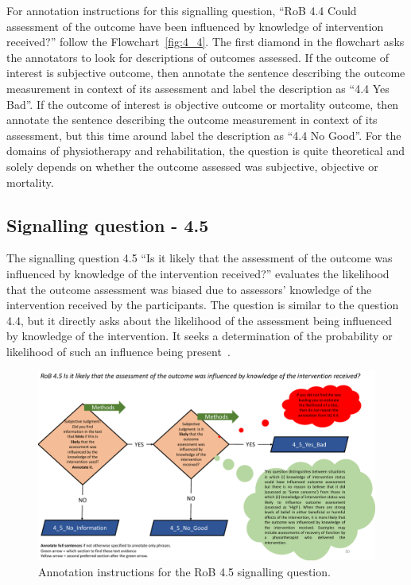 \documentclass[sn-mathphys,Numbered]{sn-jnl}%
\begin{document}
For annotation instructions for this signalling question, ``RoB 4.4 Could assessment of the outcome have been influenced by knowledge of intervention received?'' follow the Flowchart~\ref{fig:4_4}.
The first diamond in the flowchart asks the annotators to look for descriptions of outcomes assessed.
If the outcome of interest is subjective outcome, then annotate the sentence describing the outcome measurement in context of its assessment and label the description as ``4.4 Yes Bad''.
If the outcome of interest is objective outcome or mortality outcome, then annotate the sentence describing the outcome measurement in context of its assessment, but this time around label the description as ``4.4 No Good''.
For the domains of physiotherapy and rehabilitation, the question is quite theoretical and solely depends on whether the outcome assessed was subjective, objective or mortality.


%
%
%
\subsection*{Signalling question - 4.5 }
\label{subsec:4_5}
%
The signalling question 4.5 ``Is it likely that the assessment of the outcome was influenced by knowledge of the intervention received?'' evaluates the likelihood that the outcome assessment was biased due to assessors' knowledge of the intervention received by the participants.
The question is similar to the question 4.4, but it directly asks about the likelihood of the assessment being influenced by knowledge of the intervention.
It seeks a determination of the probability or likelihood of such an influence being present~\cite{watanabe2022treatment,hrobjartsson2013observer,dimitrova2017acupuncture}.


%
%
%
\begin{figure}[htbp]
    \centering
    \includegraphics[width=\textwidth]{figures/4_5.pdf}
    \caption{Annotation instructions for the RoB 4.5 signalling question.}
    \label{fig:4_5}
\end{figure}
%
%
%
\end{document}
